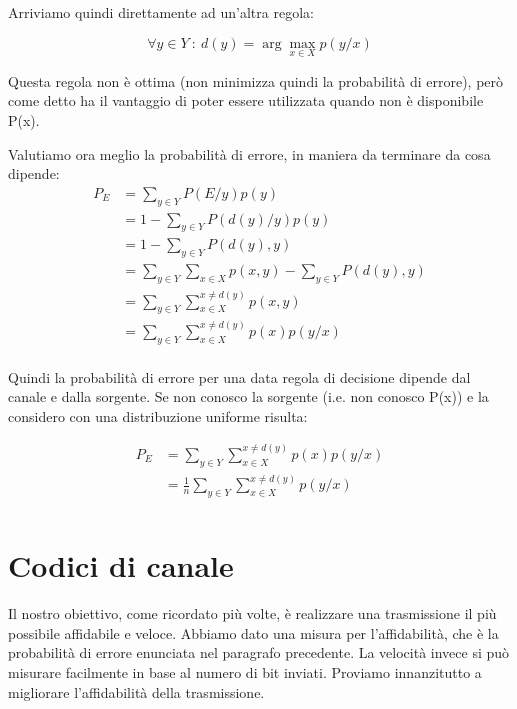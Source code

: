 Arriviamo quindi direttamente ad un'altra regola:
\begin{definizione}
\[
 \forall y \in Y \ : \ d(y)=\arg \max_{x \in X} p(y/x)
\]
\end{definizione}

Questa regola non è ottima (non minimizza quindi la probabilità di errore), però come detto ha il vantaggio di poter essere utilizzata
quando non è disponibile P(x).

\noindent
Valutiamo ora meglio la probabilità di errore, in maniera da terminare da cosa dipende:
\[\begin{split}
 P_E&=\sum_{y \in Y} P(E/y)p(y) \\
    &=1-\sum_{y \in Y} P(d(y)/y)p(y) \\
    &=1-\sum_{y \in Y} P(d(y),y) \\
    &=\sum_{y \in Y}\sum_{x \in X} p(x,y) - \sum_{y \in Y} P(d(y),y) \\
    &=\sum_{y \in Y}\sum_{x \in X}^{x \neq d(y)} p(x,y) \\
    &=\sum_{y \in Y}\sum_{x \in X}^{x \neq d(y)} p(x)p(y/x) \\
 \end{split}
\]

Quindi la probabilità di errore per una data regola di decisione dipende dal canale e dalla sorgente.
Se non conosco la sorgente (i.e. non conosco P(x)) e la considero con una distribuzione uniforme risulta:

\begin{equation}
 \begin{split}
 P_E &=\sum_{y \in Y}\sum_{x \in X}^{x \neq d(y)} p(x)p(y/x) \\
     &=\frac{1}{n}\sum_{y \in Y}\sum_{x \in X}^{x \neq d(y)} p(y/x) \\
 \end{split}
\label{perr}
\end{equation}

\section{Codici di canale}
Il nostro obiettivo, come ricordato più volte, è realizzare una trasmissione il più possibile affidabile e veloce.
Abbiamo dato una misura per l'affidabilità, che è la probabilità di errore enunciata nel paragrafo precedente. La velocità invece 
si può misurare facilmente in base al numero di bit inviati. Proviamo innanzitutto a migliorare l'affidabilità della trasmissione.

